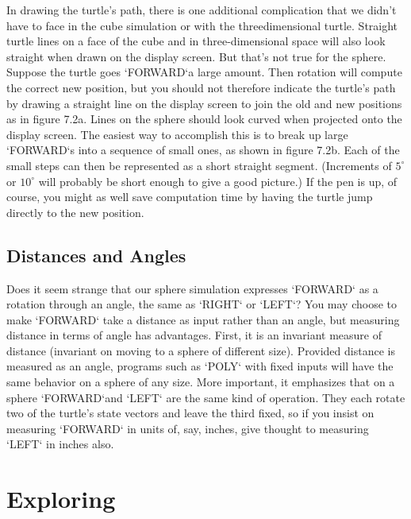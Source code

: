 \documentclass{book}
\begin{document}
In drawing the turtle's path, there is one additional complication
that we didn't have to face in the cube simulation or with the threedimensional turtle. Straight turtle lines on a face of the cube and
in three-dimensional space will also look straight when drawn on the
display screen. But that's not true for the sphere. Suppose the turtle
goes \textsc{`FORWARD`}a large amount. Then rotation will compute the correct
new position, but you should not therefore indicate the turtle's path by
drawing a straight line on the display screen to join the old and new
positions as in figure 7.2a. Lines on the sphere should look curved when
projected onto the display screen. The easiest way to accomplish this is
to break up large \textsc{`FORWARD`}s into a sequence of small ones, as shown in
figure 7.2b. Each of the small steps can then be represented as a short
straight segment. (Increments of $5^{\circ}$ or $10^{\circ}$ will probably be short enough
to give a good picture.) If the pen is up, of course, you might as well
save computation time by having the turtle jump directly to the new
position.

\subsection{Distances and Angles}

Does it seem strange that our sphere simulation expresses \textsc{`FORWARD`} as
a rotation through an angle, the same as \textsc{`RIGHT`} or \textsc{`LEFT`}? You may
choose to make \textsc{`FORWARD`} take a distance as input rather than an angle,
but measuring distance in terms of angle has advantages. First, it is
an invariant measure of distance (invariant on moving to a sphere of
different size). Provided distance is measured as an angle, programs such
as \textsc{`POLY`} with fixed inputs will have the same behavior on a sphere of any
size. More important, it emphasizes that on a sphere \textsc{`FORWARD`}and \textsc{`LEFT`}
are the same kind of operation. They each rotate two of the turtle's state
vectors and leave the third fixed, so if you insist on measuring \textsc{`FORWARD`}
in units of, say, inches, give thought to measuring \textsc{`LEFT`} in inches also.

\section{Exploring}
\end{document}
